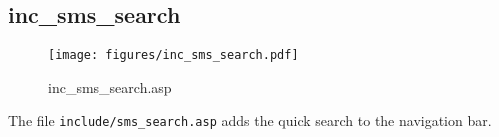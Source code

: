 \subsection{inc\_sms\_search}
\begin{figure}[htb]
    \begin{center}
        \texttt{[image: figures/inc\_sms\_search.pdf]}
    \end{center}
    \caption{inc\_sms\_search.asp}
    \label{fig:inc_sms_search}
\end{figure}

The file \verb|include/sms_search.asp| adds the quick search to the navigation
bar.
